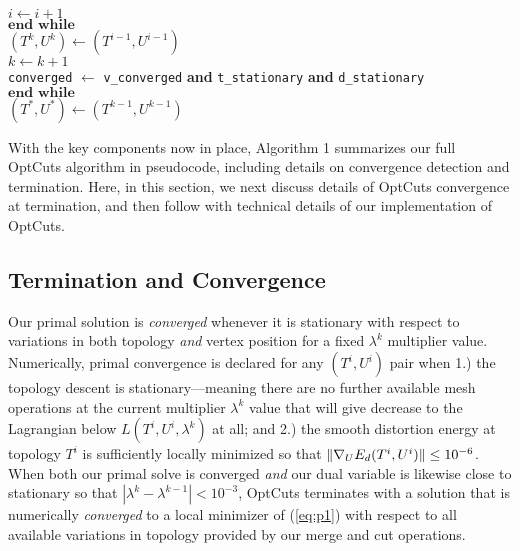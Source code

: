 \begin{algorithm}[h!]
\hspace{20pt} $i \leftarrow i + 1$ \\

\hspace{10pt} $\textbf{end while}$ \\

\hspace{10pt}  $(T^{k},U^{k}) \leftarrow (T^{i-1},U^{i-1})$ \\

\hspace{10pt} $k \leftarrow k + 1$ \\

\hspace{10pt} \texttt{converged} $\leftarrow$ \texttt{v\_converged} \textbf{and}   \texttt{t\_stationary}  \textbf{and} \texttt{d\_stationary} \\

 $\textbf{end while}$ \\
 
 $(T^{*},U^{*}) \leftarrow (T^{k-1},U^{k-1})$

\end{algorithm}

With the key components now in place, Algorithm 1 summarizes our full OptCuts algorithm in pseudocode, including details on convergence detection and termination. 
Here, in this section, we next discuss details of OptCuts convergence at termination, and 
then follow with technical details of our implementation of OptCuts. 

\subsection{Termination and Convergence}

Our primal solution is \emph{converged} whenever it is stationary with respect to variations in both topology \emph{and} vertex position for a fixed $\lambda^k$ multiplier value. Numerically, primal convergence is declared for any $(T^i,U^i)$ pair when 1.) the topology descent is stationary---meaning there are no further available mesh operations at the current multiplier $\lambda^k$ value that will give decrease to the Lagrangian below $L(T^i,U^i,\lambda^k)$ at all; and 2.) the smooth distortion energy at topology $T^i$ is sufficiently locally minimized so that $\| \nabla_{\small{U}} E_{d}(T^i,U^i)\| \leq 10^{-6}$. When both our primal solve is converged \emph{and} our dual variable is likewise close to stationary so that $| \lambda^k -  \lambda^{k-1}| < 10^{-3}$, OptCuts terminates with a solution that is numerically \emph{converged} to a local minimizer of (\ref{eq:p1}) with respect to all available variations in topology provided by our merge and cut operations. 

